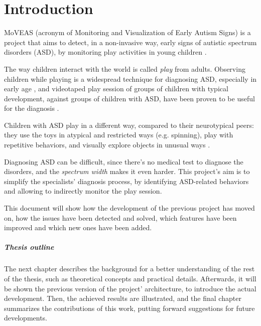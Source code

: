 \chapter{Introduction}
MoVEAS (acronym of Monitoring and Visualization of Early Autism Signs) is a project that aims to detect, in a non-invasive way, early signs of autistic spectrum disorders (ASD), by monitoring play activities in young children \cite{Bon20, Lan19}.
\bigbreak

The way children interact with the world is called \textit{play} from adults. Observing children while playing is a widespread technique for diagnosing ASD, especially in early age \cite{Ozo08}, and videotaped play session of groups of children with typical development, against groups of children with ASD, have been proven to be useful for the diagnosis \cite{Bar05, Ozo08, Wet10}.

Children with ASD play in a different way, compared to their neurotypical peers: they use the toys in atypical and restricted ways (e.g. spinning), play with repetitive behaviors, and visually explore objects in unusual ways \cite{Bru07, Ozo08}.

Diagnosing ASD can be difficult, since there's no medical test to diagnose the disorders, and the \textit{spectrum width} makes it even harder. This project's aim is to simplify the specialists' diagnosis process, by identifying ASD-related behaviors and allowing to indirectly monitor the play session.
\bigbreak

This document will show how the development of the previous project has moved on, how the issues have been detected and solved, which features have been improved and which new ones have been added.
\bigbreak

\paragraph{Thesis outline}
The next chapter describes the background for a better understanding of the rest of the thesis, such as theoretical concepts and practical details. Afterwards, it will be shown the previous version of the project' architecture, to introduce the actual development. Then, the achieved results are illustrated, and the final chapter summarizes the contributions of this work, putting forward suggestions for future developments.
